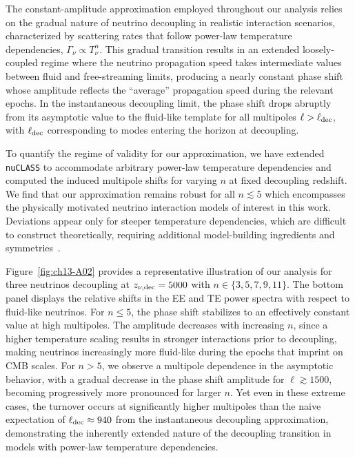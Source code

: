 \begin{subappendices}
\noindent The constant-amplitude approximation employed throughout our analysis relies on the gradual nature of neutrino decoupling in realistic interaction scenarios, characterized by scattering rates that follow power-law temperature dependencies, $\Gamma_\nu \propto T_\nu^n$. This gradual transition results in an extended loosely-coupled regime where the neutrino propagation speed takes intermediate values between fluid and free-streaming limits, producing a nearly constant phase shift whose amplitude reflects the ``average'' propagation speed during the relevant epochs. In the instantaneous decoupling limit, the phase shift drops abruptly from its asymptotic value to the fluid-like template for all multipoles $\ell > \ell_{\rm dec}$, with $\ell_{\rm dec}$ corresponding to modes entering the horizon at decoupling.

To quantify the regime of validity for our approximation, we have extended \texttt{nuCLASS} to accommodate arbitrary power-law temperature dependencies and computed the induced multipole shifts for varying $n$ at fixed decoupling redshift.  We find that our approximation remains robust for all $n \lesssim 5$ which encompasses the physically motivated neutrino interaction models of interest in this work. Deviations appear only for steeper temperature dependencies, which are difficult to construct theoretically, requiring additional model-building ingredients and symmetries~\cite{Boehm:2003hm,Stadler:2019dii}.

Figure~\ref{fig:ch13-A02} provides a representative illustration of our analysis for three neutrinos decoupling at $z_{\nu,\rm dec}=5000$ with $n \in \{3,5,7,9,11\}$. The bottom panel displays the relative shifts in the EE and TE power spectra with respect to fluid-like neutrinos. For $n \leq 5$, the phase shift stabilizes to an effectively constant value at high multipoles. The amplitude decreases with increasing $n$, since a higher temperature scaling results in stronger interactions prior to decoupling, making neutrinos increasingly more fluid-like during the epochs that imprint on CMB scales.  For $n > 5$, we observe a multipole dependence in the asymptotic behavior, with a gradual decrease in the phase shift amplitude for $\ell \gtrsim 1500$, becoming progressively more pronounced for larger $n$. Yet even in these extreme cases, the turnover occurs at significantly higher multipoles than the naive expectation of $\ell_{\rm dec} \approx 940$ from the instantaneous decoupling approximation, demonstrating the inherently extended nature of the decoupling transition in models with power-law temperature dependencies.


\end{subappendices}
